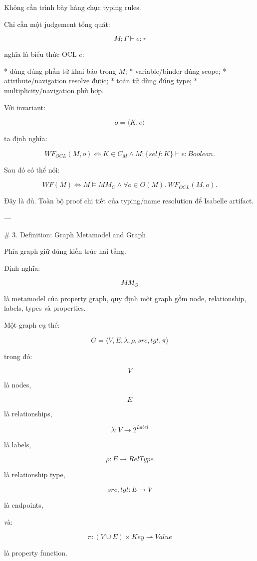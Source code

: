 Không cần trình bày hàng chục typing rules.

Chỉ cần một judgement tổng quát:

$$
\boxed{
M;\Gamma\vdash e:\tau
}
$$

nghĩa là biểu thức OCL \(e\):

* dùng đúng phần tử khai báo trong \(M\);
* variable/binder đúng scope;
* attribute/navigation resolve được;
* toán tử dùng đúng type;
* multiplicity/navigation phù hợp.

Với invariant:

$$
o=\langle K,e\rangle
$$

ta định nghĩa:

$$
\boxed{
WF_{OCL}(M,o)
\iff
K\in C_M
\land
M;\{self:K\}\vdash e:Boolean.
}
\tag{1}
$$

Sau đó có thể nói:

$$
\boxed{
WF(M)
\iff
M\models MM_C
\land
\forall o\in O(M).\ WF_{OCL}(M,o).
}
\tag{2}
$$

Đây là đủ. Toàn bộ proof chi tiết của typing/name resolution để Isabelle artifact.

---

# 3. Definition: Graph Metamodel and Graph

Phía graph giữ đúng kiến trúc hai tầng.

Định nghĩa:

$$
\boxed{
MM_G
}
$$

là metamodel của property graph, quy định một graph gồm node, relationship, labels, types và properties.

Một graph cụ thể:

$$
\boxed{
G=
\langle
V,E,\lambda,\rho,src,tgt,\pi
\rangle
}
$$

trong đó:

$$
V
$$

là nodes,

$$
E
$$

là relationships,

$$
\lambda:V\rightarrow 2^{Label}
$$

là labels,

$$
\rho:E\rightarrow RelType
$$

là relationship type,

$$
src,tgt:E\rightarrow V
$$

là endpoints,

và:

$$
\pi:(V\cup E)\times Key\rightharpoonup Value
$$

là property function.

